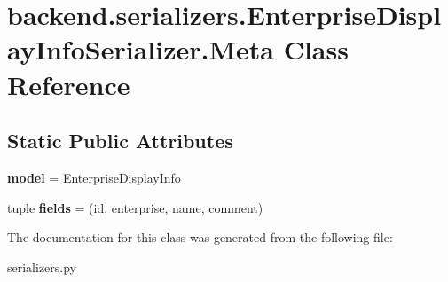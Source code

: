 \hypertarget{classbackend_1_1serializers_1_1_enterprise_display_info_serializer_1_1_meta}{}\section{backend.\+serializers.\+Enterprise\+Display\+Info\+Serializer.\+Meta Class Reference}
\label{classbackend_1_1serializers_1_1_enterprise_display_info_serializer_1_1_meta}
\subsection*{Static Public Attributes}
\begin{DoxyCompactItemize}
\item 
\mbox{\label{classbackend_1_1serializers_1_1_enterprise_display_info_serializer_1_1_meta_ad352130f940b5756dd8c2262d77ce747}} 
{\bfseries model} = \hyperlink{classbackend_1_1models_1_1_enterprise_display_info}{Enterprise\+Display\+Info}
\item 
\mbox{\label{classbackend_1_1serializers_1_1_enterprise_display_info_serializer_1_1_meta_ac0c98b8da43b375efb0a4321079d7c95}} 
tuple {\bfseries fields} = (\textquotesingle{}id\textquotesingle{}, \textquotesingle{}enterprise\textquotesingle{}, \textquotesingle{}name\textquotesingle{}, \textquotesingle{}comment\textquotesingle{})
\end{DoxyCompactItemize}


The documentation for this class was generated from the following file\+:\begin{DoxyCompactItemize}
\item 
serializers.\+py\end{DoxyCompactItemize}
